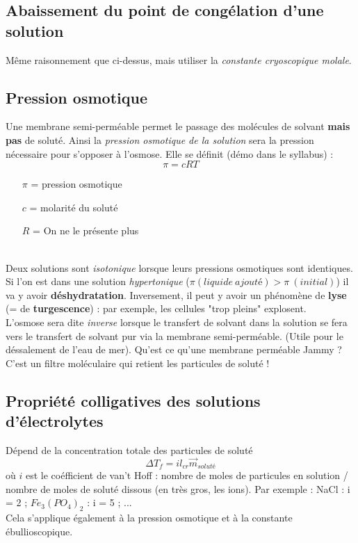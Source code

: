 \documentclass[british,french,11pt, a4paper, openany]{book}
\begin{document}
\subsection{Abaissement du point de congélation d'une solution}
Même raisonnement que ci-dessus, mais utiliser la \textit{constante cryoscopique molale}.

\subsection{Pression osmotique}
Une membrane semi-perméable permet le passage des molécules de solvant \textbf{mais pas} de soluté. Ainsi la \textit{pression osmotique de la solution} sera la pression nécessaire pour s'opposer à l'osmose. Elle se définit (démo dans le syllabus) : 
$$\pi = c R T$$
\begin{itemize}
	\item[$\pi$] = pression osmotique
	\item[$c$] = molarité du soluté
	\item[$R$] = On ne le présente plus
\end{itemize}
\ \\
Deux solutions sont \textit{isotonique} lorsque leurs pressions osmotiques sont identiques.\\

Si l'on est dans une solution \textit{hypertonique} ($\pi(liquide\ ajouté) > \pi\ (initial)$) il va y avoir \textbf{déshydratation}. Inversement, il peut y avoir un phénomène de \textbf{lyse} (= de \textbf{turgescence}) : par exemple, les cellules "trop pleins" explosent.
\\

L'osmose sera dite \textit{inverse} lorsque le transfert de solvant dans la solution se fera vers le transfert de solvant pur via la membrane semi-perméable. (Utile pour le déssalement de l'eau de mer). 
Qu'est ce qu'une membrane perméable Jammy ? C'est un filtre moléculaire qui retient les particules de soluté !

\subsection{Propriété colligatives des solutions d'électrolytes}
Dépend de la concentration totale des particules de soluté
$$\Delta T_f = i l_{cr} \vec{m}_{soluté}$$
où $i$ est le coéfficient  de van't Hoff : nombre de moles de particules en solution / nombre de moles de soluté dissous (en très gros, les ions). Par exemple : NaCl : i = 2 ; $Fe_3(PO_4)_2$ : i = 5 ; ...\\
Cela s'applique également à la pression osmotique et à la constante ébullioscopique.
\end{document}

